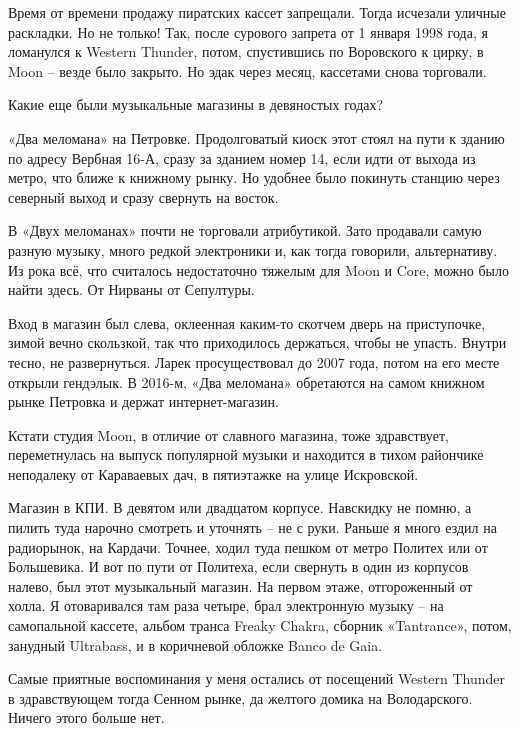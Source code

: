 Время от времени продажу пиратских кассет запрещали. Тогда исчезали уличные раскладки. Но не только! Так, после сурового запрета от 1 января 1998 года, я ломанулся к Western Thunder, потом, спустившись по Воровского к цирку, в Moon – везде было закрыто. Но эдак через месяц, кассетами снова торговали.

Какие еще были музыкальные магазины в девяностых годах?

«Два меломана» на Петровке. Продолговатый киоск этот стоял на пути к зданию по адресу Вербная 16-А, сразу за зданием номер 14, если идти от выхода из метро, что ближе к книжному рынку. Но удобнее было покинуть станцию через северный выход и сразу свернуть на восток.

В «Двух меломанах» почти не торговали атрибутикой. Зато продавали самую разную музыку, много редкой электроники и, как тогда говорили, альтернативу. Из рока всё, что считалось недостаточно тяжелым для Moon и Core, можно было найти здесь. От Нирваны от Сепултуры.

Вход в магазин был слева, оклеенная каким-то скотчем дверь на приступочке, зимой вечно скользкой, так что приходилось держаться, чтобы не упасть. Внутри тесно, не развернуться. Ларек просуществовал до 2007 года, потом на его месте открыли гендэлык. В 2016-м, «Два меломана» обретаются на самом книжном рынке Петровка и держат интернет-магазин.

Кстати студия Moon, в отличие от славного магазина, тоже здравствует, переметнулась на выпуск популярной музыки и находится в тихом райончике неподалеку от Караваевых дач, в пятиэтажке на улице Искровской.

Магазин в КПИ. В девятом или двадцатом корпусе. Навскидку не помню, а пилить туда нарочно смотреть и уточнять – не с руки. Раньше я много ездил на радиорынок, на Кардачи. Точнее, ходил туда пешком от метро Политех или от Большевика. И вот по пути от Политеха, если свернуть в один из корпусов налево, был этот музыкальный магазин. На первом этаже, отгороженный от холла. Я отоваривался там раза четыре, брал электронную музыку – на самопальной кассете, альбом транса Freaky Chakra, сборник «Tantrance», потом, занудный Ultrabass, и в коричневой обложке Banco de Gaia.

Самые приятные воспоминания у меня остались от посещений Western Thunder в здравствующем тогда Сенном рынке, да желтого домика на Володарского. Ничего этого больше нет.


